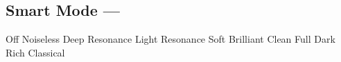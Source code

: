 \subsection[Smart Mode]{Smart Mode --- \UiKey{\I}\UiKey{\SET}}









































Off
Noiseless
Deep Resonance
Light Resonance
Soft
Brilliant
Clean
Full
Dark
Rich
Classical
